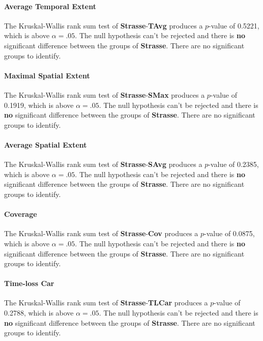 \paragraph{Average Temporal Extent}
The Kruskal-Wallis rank sum test of \textbf{Strasse}-\textbf{TAvg} produces a $p$-value of 0.5221, which is above $\alpha=.05$. The null hypothesis can't be rejected and there is \textbf{no} significant difference between the groups of \textbf{Strasse}. There are no significant groups to identify.

\paragraph{Maximal Spatial Extent}
The Kruskal-Wallis rank sum test of \textbf{Strasse}-\textbf{SMax} produces a $p$-value of 0.1919, which is above $\alpha=.05$. The null hypothesis can't be rejected and there is \textbf{no} significant difference between the groups of \textbf{Strasse}. There are no significant groups to identify.

\paragraph{Average Spatial Extent}
The Kruskal-Wallis rank sum test of \textbf{Strasse}-\textbf{SAvg} produces a $p$-value of 0.2385, which is above $\alpha=.05$. The null hypothesis can't be rejected and there is \textbf{no} significant difference between the groups of \textbf{Strasse}. There are no significant groups to identify.

\paragraph{Coverage}
The Kruskal-Wallis rank sum test of \textbf{Strasse}-\textbf{Cov} produces a $p$-value of 0.0875, which is above $\alpha=.05$. The null hypothesis can't be rejected and there is \textbf{no} significant difference between the groups of \textbf{Strasse}. There are no significant groups to identify.

\paragraph{Time-loss Car}
The Kruskal-Wallis rank sum test of \textbf{Strasse}-\textbf{TLCar} produces a $p$-value of 0.2788, which is above $\alpha=.05$. The null hypothesis can't be rejected and there is \textbf{no} significant difference between the groups of \textbf{Strasse}. There are no significant groups to identify.



